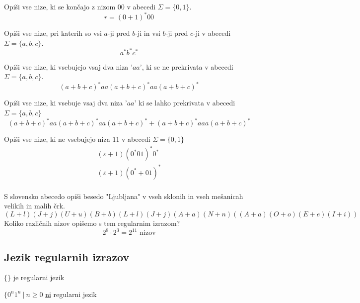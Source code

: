 \documentclass[10pt,a4paper,oneside]{book}
\begin{document}
\begin{primeri}
\item Opiši vse nize, ki se končajo z nizom $00$ v abecedi $\Sigma = \{ 0,1 \}$.
	\begin{displaymath}
	r = (0+1)^*00
	\end{displaymath}
	\item Opiši vse nize, pri katerih so vsi $a$-ji pred $b$-ji in vsi $b$-ji pred $c$-ji v abecedi $\Sigma = \lbrace a,b,c \rbrace$.
		\begin{displaymath}
		a^*b^*c^*
		\end{displaymath}
	\item Opiši vse nize, ki vsebujejo vsaj dva niza '$aa$', ki se ne prekrivata v abecedi $\Sigma = \lbrace a,b,c \rbrace$.
		\begin{displaymath}
		(a+b+c)^* aa (a+b+c)^* aa (a+b+c)^* 
		\end{displaymath}
	\item Opiši vse nize, ki vsebuje vsaj dva niza '$aa$' ki se lahko prekrivata v abecedi $\Sigma = \lbrace a,b,c \rbrace$
		\begin{displaymath}
		(a+b+c)^* aa (a+b+c)^* aa (a+b+c)^* + (a+b+c)^* aaa (a+b+c)^* 
		\end{displaymath}
	\item Opiši vse nize, ki ne vsebujejo niza $11$ v abecedi $\Sigma = \lbrace 0,1 \rbrace$\\
		\begin{align*} 
		(\varepsilon  + 1 )(0^*01)^* 0^* \\
		(\varepsilon  + 1 )(0^* + 01)^* \\
		\end{align*} 
	\item S slovensko abecedo opiši besedo "Ljubljana" v vseh sklonih in vseh mešanicah velikih in malih črk.
		\begin{displaymath}
		(L+l) (J+j) (U+u) (B+b) (L+l) (J+j) (A+a) (N+n) \left( (A+a)(O+o)(E+e)(I+i) \right) 
		\end{displaymath}
		Koliko različnih nizov opišemo s tem regularnim izrazom?\\
		\begin{displaymath}
		2^8 \cdot 2^3 = 2^{11} \mbox{ nizov}
		\end{displaymath}
\end{primeri}
\subsection{Jezik regularnih izrazov}
\begin{primeri}
	\item $ \lbrace \rbrace $ je regularni jezik
	\item $ \lbrace 0^n 1^n \ | \ n \geqslant 0 $ \underline{ni} regularni jezik%
\end{primeri}
\end{document}
